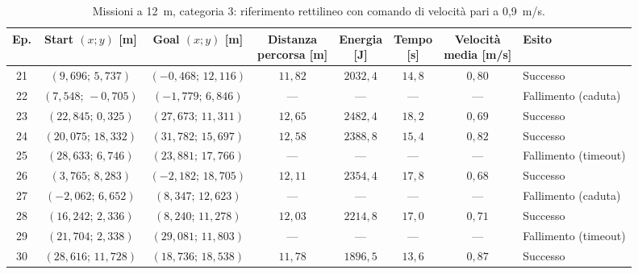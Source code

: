 \begin{table}[H]
\centering
\caption{Missioni a 12~m, categoria 3: riferimento rettilineo con comando di velocità pari a 0,9~m/s.}
\label{tab:straight-line-0-9-12m-cat3}
\begingroup
\fontsize{9}{11}\selectfont
\setlength{\tabcolsep}{2.5pt}
\renewcommand{\arraystretch}{1.2}
\begin{tabular}{@{}c cc cccc l@{}}
\toprule
Ep. & \shortstack{Start $(x;y)$\\{}[m]} & \shortstack{Goal $(x;y)$\\{}[m]} & \shortstack{Distanza\\percorsa [m]} & \shortstack{Energia\\{}[J]} & \shortstack{Tempo\\{}[s]} & \shortstack{Velocità\\media [m/s]} & Esito \\
\midrule
21 & $(9{,}696;\,5{,}737)$ & $(-0{,}468;\,12{,}116)$ & $11{,}82$ & $2032{,}4$ & $14{,}8$ & $0{,}80$ & Successo \\
22 & $(7{,}548;\,-0{,}705)$ & $(-1{,}779;\,6{,}846)$ & --- & --- & --- & --- & Fallimento (caduta) \\
23 & $(22{,}845;\,0{,}325)$ & $(27{,}673;\,11{,}311)$ & $12{,}65$ & $2482{,}4$ & $18{,}2$ & $0{,}69$ & Successo \\
24 & $(20{,}075;\,18{,}332)$ & $(31{,}782;\,15{,}697)$ & $12{,}58$ & $2388{,}8$ & $15{,}4$ & $0{,}82$ & Successo \\
25 & $(28{,}633;\,6{,}746)$ & $(23{,}881;\,17{,}766)$ & --- & --- & --- & --- & Fallimento (timeout) \\
26 & $(3{,}765;\,8{,}283)$ & $(-2{,}182;\,18{,}705)$ & $12{,}11$ & $2354{,}4$ & $17{,}8$ & $0{,}68$ & Successo \\
27 & $(-2{,}062;\,6{,}652)$ & $(8{,}347;\,12{,}623)$ & --- & --- & --- & --- & Fallimento (caduta) \\
28 & $(16{,}242;\,2{,}336)$ & $(8{,}240;\,11{,}278)$ & $12{,}03$ & $2214{,}8$ & $17{,}0$ & $0{,}71$ & Successo \\
29 & $(21{,}704;\,2{,}338)$ & $(29{,}081;\,11{,}803)$ & --- & --- & --- & --- & Fallimento (timeout) \\
30 & $(28{,}616;\,11{,}728)$ & $(18{,}736;\,18{,}538)$ & $11{,}78$ & $1896{,}5$ & $13{,}6$ & $0{,}87$ & Successo \\
\bottomrule
\end{tabular}
\endgroup
\end{table}

